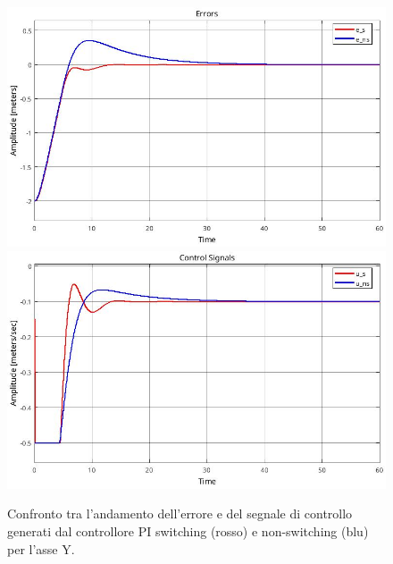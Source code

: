 \begin{figure}
    \centering
    \includegraphics[width=\textwidth]{figs/chapter4/yerrcomp.jpg}
    \vspace{0.2cm}
    \includegraphics[width=\textwidth]{figs/chapter4/ycontrolcomp.jpg}
    \caption{Confronto tra l'andamento dell'errore e del segnale di controllo generati dal controllore PI switching (rosso) e non-switching (blu) per l'asse Y.}
    \label{fig:ycomp}
\end{figure}
\clearpage

